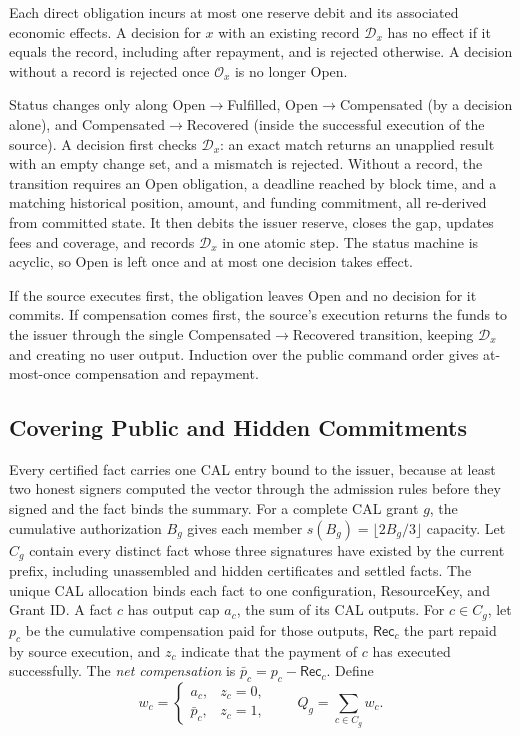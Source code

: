 \begin{lemma}
\label{lem:security-decision}
Each direct obligation incurs at most one reserve debit and its
associated economic effects. A decision for $x$ with an existing record
$\mathcal D_x$ has no effect if it equals the record, including after
repayment, and is rejected otherwise. A decision without a record is
rejected once $\mathcal O_x$ is no longer Open.
\end{lemma}
\begin{IEEEproof}
Status changes only along Open$\to$Fulfilled, Open$\to$Compensated (by a decision alone), and Compensated$\to$Recovered (inside the successful execution of the source). A decision first checks $\mathcal D_x$: an exact match returns an unapplied result with an empty change set, and a mismatch is rejected. Without a record, the transition requires an Open obligation, a deadline reached by block time, and a matching historical position, amount, and funding commitment, all re-derived from committed state. It then debits the issuer reserve, closes the gap, updates fees and coverage, and records $\mathcal D_x$ in one atomic step. The status machine is acyclic, so Open is left once and at most one decision takes effect.

If the source executes first, the obligation leaves Open and no decision for it commits. If compensation comes first, the source's execution returns the funds to the issuer through the single Compensated$\to$Recovered transition, keeping $\mathcal D_x$ and creating no user output. Induction over the public command order gives at-most-once compensation and repayment.
\end{IEEEproof}

\subsection{Covering Public and Hidden Commitments}
\label{sec:security-coverage}

Every certified fact carries one CAL entry bound to the issuer, because at least two honest signers computed the vector through the admission rules before they signed and the fact binds the summary. For a complete CAL grant $g$, the cumulative authorization $B_g$ gives each member $s(B_g)=\lfloor2B_g/3\rfloor$ capacity. Let $C_g$ contain every distinct fact whose three signatures have existed by the current prefix, including unassembled and hidden certificates and settled facts. The unique CAL allocation binds each fact to one configuration, ResourceKey, and Grant ID. A fact $c$ has output cap $a_c$, the sum of its CAL outputs. For $c\in C_g$, let $p_c$ be the cumulative compensation paid for those outputs, $\mathsf{Rec}_c$ the part repaid by source execution, and $z_c$ indicate that the payment of $c$ has executed successfully. The \emph{net compensation} is $\bar p_c=p_c-\mathsf{Rec}_c$. Define
\begin{equation}
  w_c=\begin{cases}a_c,&z_c=0,\\\bar p_c,&z_c=1,\end{cases}
  \qquad Q_g=\sum_{c\in C_g}w_c.
  \label{eq:security-risk}
\end{equation}

